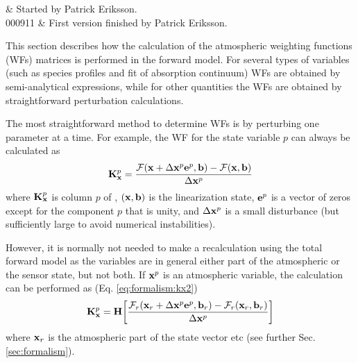 %
%
 \label{sec:wfuns}


%
%
 & Started by Patrick Eriksson.\\
  000911 & First version finished by Patrick Eriksson.\\
\stophistory


%
%
%



%
%
This section describes how the calculation of the atmospheric weighting
functions (WFs) matrices is performed in the forward model. For
several types of variables (such as species profiles and fit of
absorption continuum) WFs are obtained by semi-analytical expressions,
while for other quantities the WFs are obtained by straightforward
perturbation calculations.



 \label{sec:wfuns:approaches}

  The most straightforward method to determine WFs is by perturbing
  one parameter at a time. For example, the WF for the state variable
  $p$ can always be calculated as
  \begin{equation}
    \mathbf{K}_{\mathbf{x}}^p = \frac{\mathcal{F}(\mathbf{x}+\Delta\mathbf{x}^p\mathbf{e}^p,\mathbf{b})-\mathcal{F}(\mathbf{x},\mathbf{b})}
                                     {\Delta\mathbf{x}^p}
   \label{eq:wfuns:perturb}
  \end{equation}
  where $\mathbf{K}_{\mathbf{x}}^p$ is column $p$ of \Kx, $(\mathbf{x},\mathbf{b})$ is the
  linearization state, $\mathbf{e}^p$ is a vector of zeros except for the
  component $p$ that is unity, and $\Delta\mathbf{x}^p$ is a small disturbance
  (but sufficiently large to avoid numerical instabilities).
  
  However, it is normally not needed to make a recalculation using the
  total forward model as the variables are in general either part of the
  atmospheric or the sensor state, but not both. If $\mathbf{x}^p$ is an atmospheric
  variable, the calculation can be performed as (Eq. \ref{eq:formalism:kx2})
  \begin{equation}
    \mathbf{K}_{\mathbf{x}}^p = \mathbf{H} \bigg[
    \frac{\mathcal{F}_r(\mathbf{x}_r+\Delta\mathbf{x}^p\mathbf{e}^p,\mathbf{b}_r)-
           \mathcal{F}_r(\mathbf{x}_r,\mathbf{b}_r)}  {\Delta\mathbf{x}^p} \bigg]
   \label{eq:wfuns:Hpert}
  \end{equation}
  where $\mathbf{x}_r$ is the atmospheric part of the state vector etc (see
  further Sec. \ref{sec:formalism}).
 

